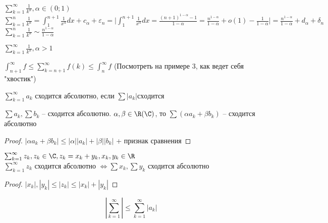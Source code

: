 \begin{Example}
	$\sum_{k=1}^{\infty} \frac{1}{k^{\alpha}}, \alpha \in (0;1)$\\
	$\sum_{k=1}^{n} \frac{1}{k^{\alpha}} = \int_{1}^{n+1} \frac{1}{x^{\alpha}} dx + c_{\alpha} + \varepsilon_n = 
	\Bigg| \int_{1}^{n+1} \frac{1}{x^{\alpha}}dx = \frac{(n+1)^{1-\alpha}-1}{1-\alpha} =  \frac{n^{1-\alpha}}{1-\alpha}
	+ o(1) - \frac{1}{1-\alpha}\Bigg| = \frac{n^{1-\alpha}}{1-\alpha} + d_{\alpha} + \delta_n$\\
	$\sum_{k=1}^{n} \frac{1}{k^{\alpha}} \sim \frac{n^{1-\alpha}}{1-\alpha}$
\end{Example}

\begin{Ex}
	$\sum_{k=1}^{\infty} \frac{1}{k^{\alpha}}, \alpha > 1$
\end{Ex}

\begin{Rem}
	$\int_{n+1}^{\infty} f \leqslant \sum_{k=n+1}^{\infty} f(k) \leqslant \int_{n}^{\infty} f$ (Посмотреть на примере 3, как
	ведет себя "хвостик")
\end{Rem}

\begin{Def} 
	$\sum_{k=1}^{\infty} a_k$ сходится абсолютно, если $\sum |a_k| сходится$
\end{Def} 

\begin{Rem}
	$\sum a_k, \sum b_k$ -- сходится абсолютно. 
	$\alpha, \beta \in \R (\C)$, то $\sum (\alpha a_k + \beta b_k)$ -- сходится абсолютно\\ 
\end{Rem}

\begin{proof}
	$|\alpha a_k + \beta b_k| \leqslant |\alpha||a_k|+|\beta||b_k|$ + признак сравнения
\end{proof}

\begin{Rem}
	$\sum_{k=1}^{\infty} z_k, z_k \in \C, z_k = x_k + y_k, x_k, y_k \in \R$\\
	$\sum_{k=1}^{\infty} z_k$ сходится абсолютно $\Leftrightarrow \sum x_k, \sum y_k$  сходится абсолютно
\end{Rem}

\begin{proof}
	$|x_k|, |y_k| \leqslant |z_k| \leqslant |x_k| + |y_k|$ 
\end{proof}

\begin{Rem}
	$$\left| \sum_{k=1}^{\infty}  \right|\leqslant \sum_{k=1}^{\infty} |a_k|$$
\end{Rem}

